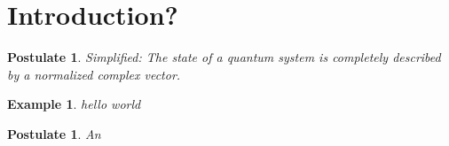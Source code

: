 \documentclass[12pt]{article}
\theoremstyle{plain}
\newtheorem{postulate}[theorem]{Postulate}
\newtheorem*{example}{Example}
\theoremstyle{definition}
\begin{document}
\tableofcontents

\break


\section{Introduction?}

\begin{postulate}
    Simplified: The state of a quantum system is completely described by a normalized complex vector.
\end{postulate}

\begin{example}
    hello world
\end{example}

\begin{postulate}
    An
\end{postulate}
\end{document}
